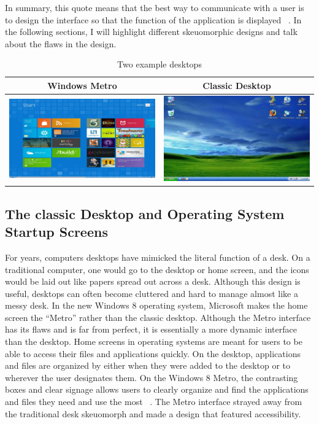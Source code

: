 \documentclass{article}
\begin{document}
In summary, this quote means that the best way to communicate with a user is to design the interface so that the function of the application is displayed ~\cite{Gizmodo}. In the following sections, I will highlight different skeuomorphic designs and talk about the flaws in the design.

\begin{table}
\centering
\begin{tabular}{|c|c|}\hline
Windows Metro & Classic Desktop \\\hline\hline
\includegraphics[width = 2.5in]{metro.jpeg} & \includegraphics[width = 2.5in]{pc-desktop.jpeg} \\\hline
\end{tabular}

\caption{Two example desktops}
\label{desktops}
\end{table}

\subsection{The classic Desktop and Operating System Startup Screens}
	For years, computers desktops have mimicked the literal function of a desk. On a traditional computer, one would go to the desktop or home screen, and the icons would be laid out like papers spread out across a desk. Although this design is useful, desktops can often become cluttered and hard to manage almost like a messy desk. In the new Windows 8 operating system, Microsoft makes the home screen the “Metro” rather than the classic desktop. Although the Metro interface has its flaws and is far from perfect, it is essentially a more dynamic interface than the desktop. Home screens in operating systems are meant for users to be able to access their files and applications quickly. On the desktop, applications and files are organized by either when they were added to the desktop or to wherever the user designates them. On the Windows 8 Metro, the contrasting boxes and clear signage allows users to clearly organize and find the applications and files they need and use the most ~\cite{Hobbs}. The Metro interface strayed away from the traditional desk skeuomorph and made a design that featured accessibility. 
\end{document}

